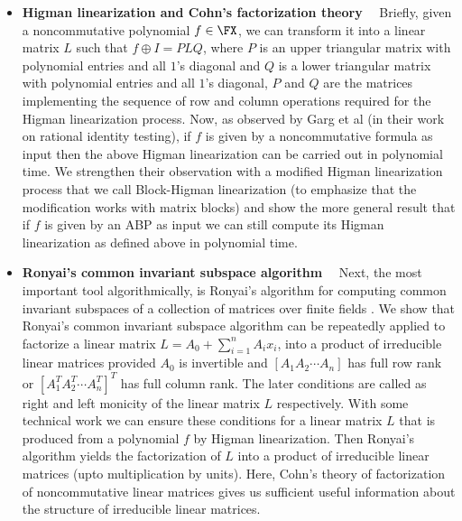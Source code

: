 \begin{itemize}
\item \textbf{Higman linearization and Cohn's factorization theory}~~
  Briefly, given a noncommutative polynomial $f\in\FX$, we can
  transform it into a linear matrix $L$ such that $f\oplus I = PLQ$,
  where $P$ is an upper triangular matrix with polynomial entries and
  all $1$'s diagonal and $Q$ is a lower triangular matrix with
  polynomial entries and all $1$'s diagonal, $P$ and $Q$ are the
  matrices implementing the sequence of row and column operations
  required for the Higman linearization process. Now, as observed
  by Garg et al \cite{GGOW20} (in their work on rational identity
  testing), if $f$ is given by a noncommutative formula as input
  then the above Higman linearization can be carried out in polynomial
  time. We strengthen their observation with a modified Higman
  linearization process that we call Block-Higman linearization (to
  emphasize that the modification works with matrix blocks) and
  show the more general result that if $f$ is given by an ABP as input
  we can still compute its Higman linearization as defined above
  in polynomial time.

%

\item \textbf{Ronyai's common invariant subspace algorithm}~~ Next,
  the most important tool algorithmically, is Ronyai's algorithm for
  computing common invariant subspaces of a collection of matrices
  over finite fields \cite{Ronyai2}. We show that Ronyai's common
  invariant subspace algorithm can be repeatedly applied to factorize
  a linear matrix $L=A_0+\sum_{i=1}^n A_i x_i$, into a product of
  irreducible linear matrices provided $A_0$ is invertible and
  $[A_1 A_2\cdots A_n]$ has full row rank or
  $[A_1^T A_2^T\cdots A_n^T]^T$ has full column rank. The later
  conditions are called as right and left monicity of the linear
  matrix $L$ respectively. With some technical work we can ensure
  these conditions for a linear matrix $L$ that is produced from a
  polynomial $f$ by Higman linearization. Then Ronyai's algorithm
  yields the factorization of $L$ into a product of irreducible linear
  matrices (upto multiplication by units). Here, Cohn's theory of
  factorization of noncommutative linear matrices gives us sufficient
  useful information about the structure of irreducible linear matrices.


\end{itemize}
